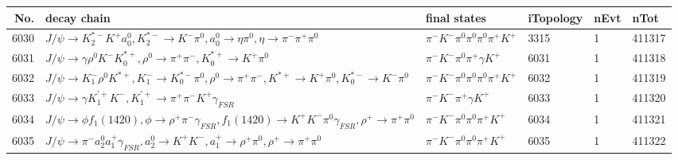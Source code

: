 \begin{table}[htbp] 
\begin{center}
\begin{small}
\begin{tabular}{rlllll}\hline\hline
 No. & decay chain & final states &  iTopology & nEvt & nTot \\\hline
6030&$J/\psi       \rightarrow K_2^{*-}       K^{+}          a_{0}^{0}      , K_2^{*-}        \rightarrow K^{-}          \pi^{0}        , a_{0}^{0}       \rightarrow \eta          \pi^{0}        , \eta           \rightarrow \pi^{-}        \pi^{+}        \pi^{0}        $&$\pi^{-}        K^{-}          \pi^{0}        \pi^{0}        \pi^{0}        \pi^{+}        K^{+}          $& 3315&    1&411317\\
6031&$J/\psi       \rightarrow \gamma       \rho^{0}      K^{-}          K_{0}^{*+}     , \rho^{0}       \rightarrow \pi^{+}        \pi^{-}        , K_{0}^{*+}      \rightarrow K^{+}          \pi^{0}        $&$\pi^{-}        K^{-}          \pi^{0}        \pi^{+}        \gamma       K^{+}          $& 6031&    1&411318\\
6032&$J/\psi       \rightarrow K_{1}^{-}      \rho^{0}      K^{*+}         , K_{1}^{-}       \rightarrow K_{0}^{*-}     \pi^{0}        , \rho^{0}       \rightarrow \pi^{+}        \pi^{-}        , K^{*+}          \rightarrow K^{+}          \pi^{0}        , K_{0}^{*-}      \rightarrow K^{-}          \pi^{0}        $&$\pi^{-}        K^{-}          \pi^{0}        \pi^{0}        \pi^{0}        \pi^{+}        K^{+}          $& 6032&    1&411319\\
6033&$J/\psi       \rightarrow \gamma       K_1^{'+}      K^{-}          , K_1^{'+}       \rightarrow \pi^{+}        \pi^{-}        K^{+}          \gamma_{FSR} $&$\pi^{-}        K^{-}          \pi^{+}        \gamma       K^{+}          $& 6033&    1&411320\\
6034&$J/\psi       \rightarrow \phi           f_{1}(1420)    , \phi            \rightarrow \rho^{+}      \pi^{-}        \gamma_{FSR} , f_{1}(1420)     \rightarrow K^{+}          K^{-}          \pi^{0}        \gamma_{FSR} , \rho^{+}       \rightarrow \pi^{+}        \pi^{0}        $&$\pi^{-}        K^{-}          \pi^{0}        \pi^{0}        \pi^{+}        K^{+}          $& 6034&    1&411321\\
6035&$J/\psi       \rightarrow \pi^{-}        a_{2}^{0}      a_{1}^{+}      \gamma_{FSR} , a_{2}^{0}       \rightarrow K^{+}          K^{-}          , a_{1}^{+}       \rightarrow \rho^{+}      \pi^{0}        , \rho^{+}       \rightarrow \pi^{+}        \pi^{0}        $&$\pi^{-}        K^{-}          \pi^{0}        \pi^{0}        \pi^{+}        K^{+}          $& 6035&    1&411322\\

\end{tabular}
\end{small}
\end{center}
\end{table}
